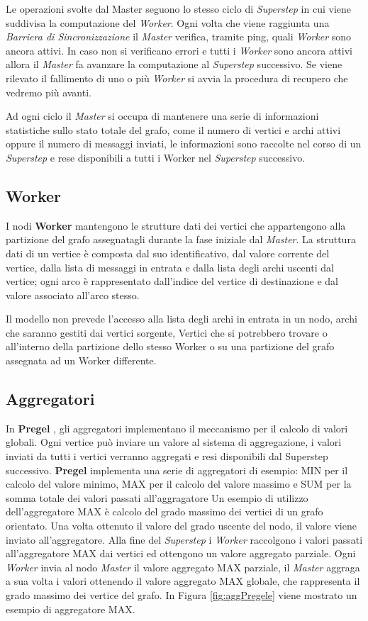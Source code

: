 \documentclass[LaM,binding=0.6cm]{sapthesis}
\begin{document}
Le operazioni svolte dal Master seguono lo stesso ciclo di \textit{Superstep} in cui viene suddivisa la computazione del \textit{Worker}.
Ogni volta che viene raggiunta una \textit{Barriera di Sincronizzazione} il \textit{Master} verifica, tramite ping, quali \textit{Worker} sono ancora attivi. In caso non si verificano errori e tutti i \textit{Worker} sono ancora attivi allora il \textit{Master} fa avanzare la computazione al \textit{Superstep} successivo. Se viene rilevato il fallimento di uno o più \textit{Worker} si avvia la procedura di recupero che vedremo più avanti.

Ad ogni ciclo il \textit{Master} si occupa di mantenere una serie di informazioni statistiche sullo stato totale del grafo, come il numero di vertici e archi attivi oppure il numero di messaggi inviati, le informazioni sono raccolte nel corso di un \textit{Superstep }e rese disponibili a tutti i Worker nel \textit{Superstep} successivo.

\subsection{Worker}
I nodi \textbf{Worker} mantengono le strutture dati dei vertici che appartengono alla partizione del grafo assegnatagli durante la fase iniziale dal \textit{Master}. La struttura dati di un vertice è composta dal suo identificativo, dal valore corrente del vertice, dalla lista di messaggi in entrata e dalla lista degli archi uscenti dal vertice; ogni arco è rappresentato dall'indice del vertice di destinazione e dal valore associato all'arco stesso.

Il modello non prevede l'accesso alla lista degli archi in entrata in un nodo, archi che saranno gestiti dai vertici sorgente, Vertici che si potrebbero trovare o all'interno della partizione dello stesso Worker o su una partizione del grafo assegnata ad un Worker differente.

\subsection{Aggregatori}
In \textbf{Pregel }\cite{Malewicz:2010:PSL:1807167.1807184}, gli aggregatori implementano il meccanismo per il calcolo di valori globali. Ogni vertice può inviare un valore al sistema di aggregazione, i valori inviati da tutti i vertici verranno aggregati e resi disponibili dal Superstep successivo. 
\textbf{Pregel} implementa una serie di aggregatori di esempio: MIN per il calcolo del valore minimo, MAX per il calcolo del valore massimo e SUM per la somma totale dei valori passati all'aggragatore
Un esempio di utilizzo dell'aggregatore MAX è calcolo del grado massimo dei vertici di un grafo orientato. Una volta ottenuto il valore del grado uscente del nodo, il valore viene inviato all'aggregatore. Alla fine del \textit{Superstep} i \textit{Worker} raccolgono i valori passati all'aggregatore MAX dai vertici ed ottengono un valore aggregato parziale. 
Ogni \textit{Worker} invia al nodo \textit{Master }il valore aggregato MAX parziale, il \textit{Master }aggraga a sua volta i valori ottenendo il valore aggregato MAX globale, che rappresenta il grado massimo dei vertice del grafo. In Figura \ref{fig:aggPregele} viene mostrato un esempio di aggregatore MAX.
\end{document}

